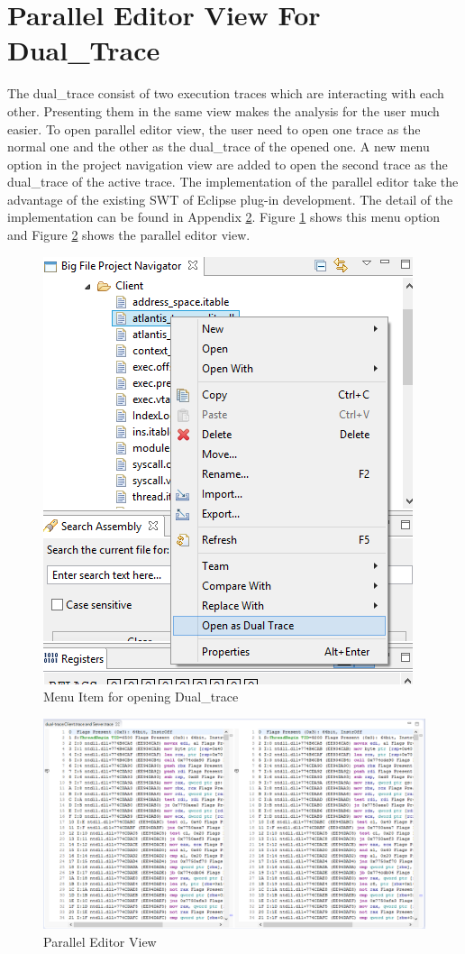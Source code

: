 \section{Parallel Editor View For Dual\_Trace}
The dual\_trace consist of two execution traces which are interacting with each other. Presenting them in the same view makes the analysis for the user much easier. To open parallel editor view, the user need to open one trace as the normal one and the other as the dual\_trace of the opened one. A new menu option in the project navigation view are added to open the second trace as the dual\_trace of the active trace. The implementation of the parallel editor take the advantage of the existing SWT of Eclipse plug-in development. The detail of the implementation can be found in Appendix \ref{paralleleditor}. Figure \ref{opendualtracemenu} shows this menu option and Figure \ref{paralleleditor} shows the parallel editor view.

\begin{figure}[H]
\centerline{\includegraphics[scale=0.4]{Figures/opendualtracemenu}}
 \caption{Menu Item for opening Dual\_trace}
\label{opendualtracemenu}
\end{figure}

\begin{figure}[H]
\centerline{\includegraphics[scale=0.6]{Figures/paralleleditor}}
 \caption{Parallel Editor View}
\label{paralleleditor}
\end{figure}

